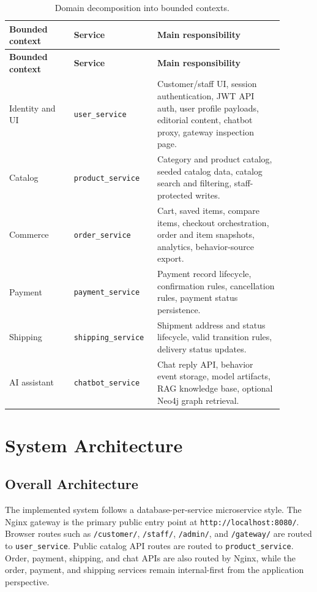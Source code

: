 \documentclass[12pt,a4paper]{article}
\begin{document}
\begin{longtable}{p{0.22\linewidth}p{0.24\linewidth}p{0.43\linewidth}}
\caption{Domain decomposition into bounded contexts.}
\label{tab:bounded-contexts}\\
\toprule
\textbf{Bounded context} & \textbf{Service} & \textbf{Main responsibility}\\
\midrule
\endfirsthead
\toprule
\textbf{Bounded context} & \textbf{Service} & \textbf{Main responsibility}\\
\midrule
\endhead
Identity and UI & \texttt{user\_service} & Customer/staff UI, session authentication, JWT API auth, user profile payloads, editorial content, chatbot proxy, gateway inspection page.\\
Catalog & \texttt{product\_service} & Category and product catalog, seeded catalog data, catalog search and filtering, staff-protected writes.\\
Commerce & \texttt{order\_service} & Cart, saved items, compare items, checkout orchestration, order and item snapshots, analytics, behavior-source export.\\
Payment & \texttt{payment\_service} & Payment record lifecycle, confirmation rules, cancellation rules, payment status persistence.\\
Shipping & \texttt{shipping\_service} & Shipment address and status lifecycle, valid transition rules, delivery status updates.\\
AI assistant & \texttt{chatbot\_service} & Chat reply API, behavior event storage, model artifacts, RAG knowledge base, optional Neo4j graph retrieval.\\
\bottomrule
\end{longtable}

\section{System Architecture}

\subsection{Overall Architecture}

The implemented system follows a database-per-service microservice style. The Nginx gateway is the primary public entry point at \texttt{http://localhost:8080/}. Browser routes such as \texttt{/customer/}, \texttt{/staff/}, \texttt{/admin/}, and \texttt{/gateway/} are routed to \texttt{user\_service}. Public catalog API routes are routed to \texttt{product\_service}. Order, payment, shipping, and chat APIs are also routed by Nginx, while the order, payment, and shipping services remain internal-first from the application perspective.
\end{document}
